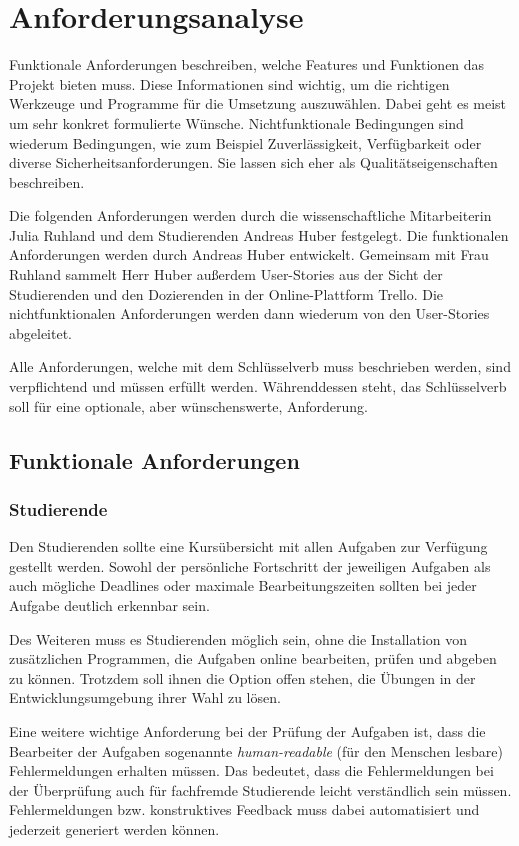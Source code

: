 \section{Anforderungsanalyse}\label{anforderungsanalyse}
Funktionale Anforderungen beschreiben, welche Features und Funktionen das
Projekt bieten muss. Diese Informationen sind wichtig, um die richtigen
Werkzeuge und Programme für die Umsetzung auszuwählen. Dabei geht es meist um
sehr konkret formulierte Wünsche. Nichtfunktionale Bedingungen sind wiederum
Bedingungen, wie zum Beispiel Zuverlässigkeit, Verfügbarkeit oder diverse
Sicherheitsanforderungen. Sie lassen sich eher als Qualitätseigenschaften
beschreiben.

Die folgenden Anforderungen werden durch die wissenschaftliche Mitarbeiterin
Julia Ruhland und dem Studierenden Andreas Huber festgelegt. Die funktionalen
Anforderungen werden durch Andreas Huber entwickelt. Gemeinsam mit Frau Ruhland
sammelt Herr Huber außerdem User-Stories aus der Sicht der Studierenden und den
Dozierenden in der Online-Plattform Trello. Die nichtfunktionalen Anforderungen
werden dann wiederum von den User-Stories abgeleitet. %

Alle Anforderungen, welche mit dem Schlüsselverb \glqq muss\grqq{} beschrieben
werden, sind verpflichtend und müssen erfüllt werden. Währenddessen steht, das Schlüsselverb \glqq soll\grqq{} für eine optionale, aber wünschenswerte,
Anforderung.

\subsection{Funktionale Anforderungen}\label{anforderungsanalyse-funktional}
\subsubsection{Studierende}\label{anforderungsanalyse-funktional-stud}
Den Studierenden sollte eine Kursübersicht mit allen Aufgaben zur Verfügung
gestellt werden. Sowohl der persönliche Fortschritt der jeweiligen Aufgaben als
auch mögliche Deadlines oder maximale Bearbeitungszeiten sollten bei jeder
Aufgabe deutlich erkennbar sein.

Des Weiteren muss es Studierenden möglich sein, ohne die Installation von
zusätzlichen Programmen, die Aufgaben online bearbeiten, prüfen und abgeben zu
können. Trotzdem soll ihnen die Option offen stehen, die Übungen in der
Entwicklungsumgebung ihrer Wahl zu lösen.

Eine weitere wichtige Anforderung bei der Prüfung der Aufgaben ist, dass die
Bearbeiter der Aufgaben sogenannte \emph{human-readable} (für den Menschen
lesbare) Fehlermeldungen erhalten müssen. Das bedeutet, dass die Fehlermeldungen
bei der Überprüfung auch für fachfremde Studierende leicht verständlich sein
müssen. Fehlermeldungen bzw. konstruktives Feedback muss dabei automatisiert und
jederzeit generiert werden können.

